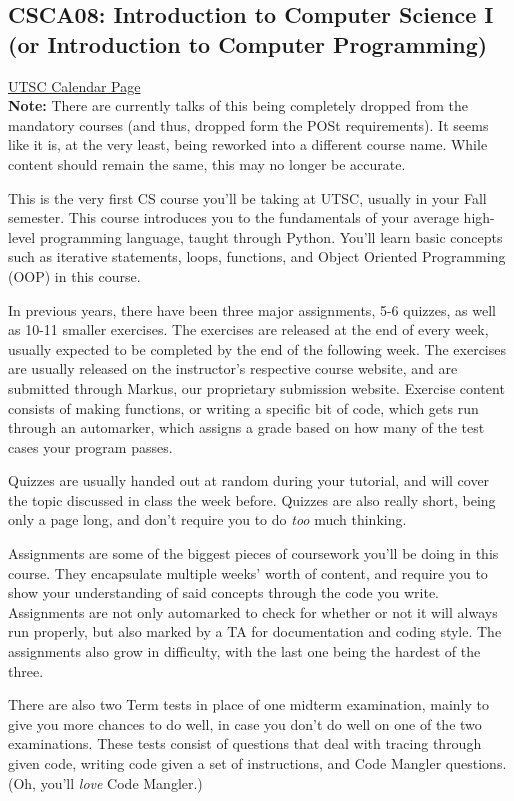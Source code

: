 \documentclass[11pt]{article}
\begin{document}
\subsection{CSCA08: Introduction to Computer Science I 
(or Introduction to Computer Programming)}

\href{https://utsc.calendar.utoronto.ca/course/CSCA08H3}{UTSC Calendar Page}\\

\textbf{Note:} 
There are currently talks of this being completely dropped from the
mandatory courses (and thus, dropped form the POSt requirements). It
seems like it is, at the very least, being reworked into a different
course name. While content should remain the same, this may no longer be
accurate.

This is the very first CS course you'll be taking at UTSC, usually in
your Fall semester. This course introduces you to the fundamentals of
your average high-level programming language, taught through Python.
You'll learn basic concepts such as iterative statements, loops,
functions, and Object Oriented Programming (OOP) in this course.

In previous years, there have been three major assignments, 5-6 quizzes,
as well as 10-11 smaller exercises. The exercises are released at the
end of every week, usually expected to be completed by the end of the
following week. The exercises are usually released on the instructor's
respective course website, and are submitted through Markus, our
proprietary submission website. Exercise content consists of making
functions, or writing a specific bit of code, which gets run through an
automarker, which assigns a grade based on how many of the test cases
your program passes.

Quizzes are usually handed out at random during your tutorial, and
will cover the topic discussed in class the week before. Quizzes are
also really short, being only a page long, and don't require you to do
\textit{too} much thinking.

Assignments are some of the biggest pieces of coursework you'll be doing
in this course. They encapsulate multiple weeks' worth of content,
and require you to show your understanding of said concepts through
the code you write. Assignments are not only automarked to check for
whether or not it will always run properly, but also marked by a TA for
documentation and coding style. The assignments also grow in difficulty,
with the last one being the hardest of the three.

There are also two Term tests in place of one midterm examination,
mainly to give you more chances to do well, in case you don't do well
on one of the two examinations. These tests consist of questions that
deal with tracing through given code, writing code given a set of
instructions, and Code Mangler questions. (Oh, you'll \textit{love} Code
Mangler.)
\end{document}
